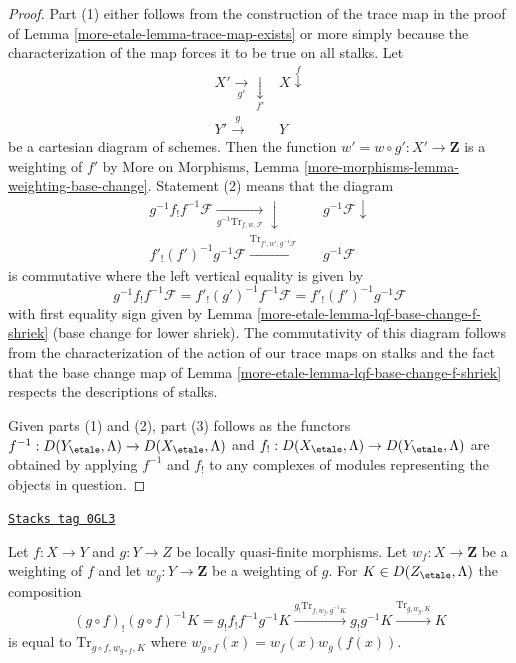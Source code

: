 \begin{proof}
Part (1) either follows from the construction of the trace map
in the proof of Lemma \ref{more-etale-lemma-trace-map-exists}
or more simply because the characterization of the map
forces it to be true on all stalks.
Let
$$
\begin{array}{cc}X' \underset{g'}{\longrightarrow}\underset{f'}{\downarrow} & X \overset{f}{\downarrow} \\ Y' \overset{g}{\longrightarrow} & Y\end{array}
$$
be a cartesian diagram of schemes. Then the function
$w' = w \circ g' : X' \to \mathbf{Z}$ is a weighting of $f'$ by
More on Morphisms, Lemma \ref{more-morphisms-lemma-weighting-base-change}.
Statement (2) means that the diagram
$$
\begin{array}{ccc}g^{-1}f_!f^{-1}\mathcal{F}
\underset{g^{-1}\text{Tr}_{f, w, \mathcal{F}}}{\longrightarrow}\downarrow &  & g^{-1}\mathcal{F} \downarrow \\ f'_!(f')^{-1}g^{-1}\mathcal{F}
\overset{\text{Tr}_{f', w', g^{-1}\mathcal{F}}}{\longrightarrow} &  & g^{-1}\mathcal{F}\end{array}
$$
is commutative where the left vertical equality is given by
$$
g^{-1}f_!f^{-1}\mathcal{F} =
f'_!(g')^{-1}f^{-1}\mathcal{F} =
f'_!(f')^{-1}g^{-1}\mathcal{F}
$$
with first equality sign given by Lemma \ref{more-etale-lemma-lqf-base-change-f-shriek}
(base change for lower shriek). The commutativity of this diagram
follows from the characterization of the action of our trace maps
on stalks and the fact that the base change map of
Lemma \ref{more-etale-lemma-lqf-base-change-f-shriek} respects the descriptions of stalks.

\medskip\noindent
Given parts (1) and (2), part (3) follows as the functors
$f^{-1} : D(Y_\etale, \Lambda) \to D(X_\etale, \Lambda)$ and
$f_! : D(X_\etale, \Lambda) \to D(Y_\etale, \Lambda)$
are obtained by applying $f^{-1}$ and $f_!$ to any complexes
of modules representing the objects in question.
\end{proof}

\begin{lemma}
\label{more-etale-lemma-trace-composition}
\href{https://stacks.math.columbia.edu/tag/0GL3}{\texttt{Stacks tag 0GL3}}

Let $f : X \to Y$ and $g : Y \to Z$ be locally quasi-finite morphisms.
Let $w_f : X \to \mathbf{Z}$ be a weighting of $f$ and let
$w_g : Y \to \mathbf{Z}$ be a weighting of $g$. For
$K \in D(Z_\etale, \Lambda)$ the composition
$$
(g \circ f)_!(g \circ f)^{-1}K =
g_! f_! f^{-1} g^{-1}K
\xrightarrow{g_! \text{Tr}_{f, w_f, g^{-1}K}}
g_!g^{-1}K
\xrightarrow{\text{Tr}_{g, w_g, K}}
K
$$
is equal to $\text{Tr}_{g \circ f, w_{g \circ f}, K}$ where
$w_{g \circ f}(x) = w_f(x) w_g(f(x))$.
\end{lemma}

